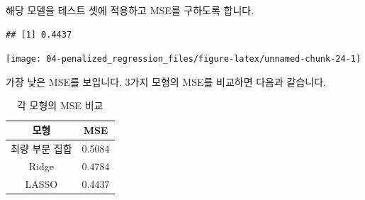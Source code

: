 \documentclass[12pt,]{book}
\newenvironment{Shaded}{\begin{snugshade}}{\end{snugshade}}
\newcommand{\DataTypeTok}[1]{\textcolor[rgb]{0.13,0.29,0.53}{#1}}
\newcommand{\DecValTok}[1]{\textcolor[rgb]{0.00,0.00,0.81}{#1}}
\newcommand{\FloatTok}[1]{\textcolor[rgb]{0.00,0.00,0.81}{#1}}
\newcommand{\KeywordTok}[1]{\textcolor[rgb]{0.13,0.29,0.53}{\textbf{#1}}}
\newcommand{\NormalTok}[1]{#1}
\newcommand{\OperatorTok}[1]{\textcolor[rgb]{0.81,0.36,0.00}{\textbf{#1}}}
\newcommand{\StringTok}[1]{\textcolor[rgb]{0.31,0.60,0.02}{#1}}
\begin{document}
해당 모델을 테스트 셋에 적용하고 MSE를 구하도록 합니다.

\begin{Shaded}
\end{Shaded}

\begin{verbatim}
## [1] 0.4437
\end{verbatim}

\begin{center}\texttt{[image: 04-penalized\_regression\_files/figure-latex/unnamed-chunk-24-1]} \end{center}

가장 낮은 MSE를 보입니다. 3가지 모형의 MSE를 비교하면 다음과 같습니다.

\begin{table}[!h]

\caption{\label{tab:unnamed-chunk-25}각 모형의 MSE 비교}
\centering
\begin{tabular}[t]{cc}
\toprule
모형 & MSE\\
\midrule
\rowcolor{gray!6}  최량 부분 집합 & 0.5084\\
Ridge & 0.4784\\
\rowcolor{gray!6}  LASSO & 0.4437\\
\bottomrule
\end{tabular}
\end{table}
\end{document}
